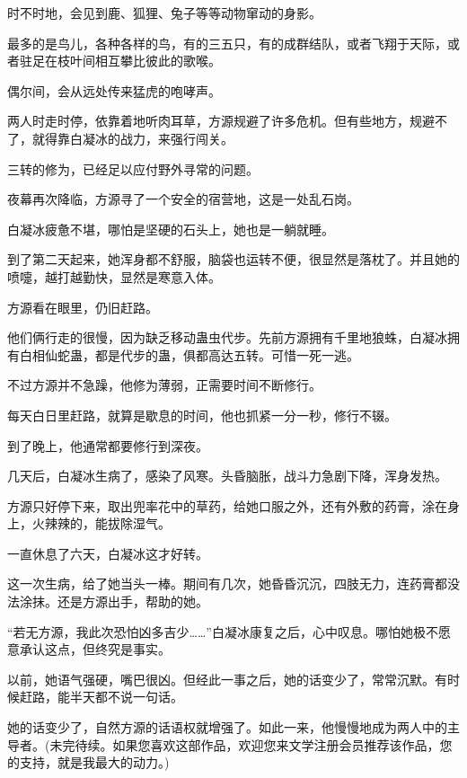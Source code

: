 \begin{this_body}
时不时地，会见到鹿、狐狸、兔子等等动物窜动的身影。

最多的是鸟儿，各种各样的鸟，有的三五只，有的成群结队，或者飞翔于天际，或者驻足在枝叶间相互攀比彼此的歌喉。

偶尔间，会从远处传来猛虎的咆哮声。

两人时走时停，依靠着地听肉耳草，方源规避了许多危机。但有些地方，规避不了，就得靠白凝冰的战力，来强行闯关。

三转的修为，已经足以应付野外寻常的问题。

夜幕再次降临，方源寻了一个安全的宿营地，这是一处乱石岗。

白凝冰疲惫不堪，哪怕是坚硬的石头上，她也是一躺就睡。

到了第二天起来，她浑身都不舒服，脑袋也运转不便，很显然是落枕了。并且她的喷嚏，越打越勤快，显然是寒意入体。

方源看在眼里，仍旧赶路。

他们俩行走的很慢，因为缺乏移动蛊虫代步。先前方源拥有千里地狼蛛，白凝冰拥有白相仙蛇蛊，都是代步的蛊，俱都高达五转。可惜一死一逃。

不过方源并不急躁，他修为薄弱，正需要时间不断修行。

每天白日里赶路，就算是歇息的时间，他也抓紧一分一秒，修行不辍。

到了晚上，他通常都要修行到深夜。

几天后，白凝冰生病了，感染了风寒。头昏脑胀，战斗力急剧下降，浑身发热。

方源只好停下来，取出兜率花中的草药，给她口服之外，还有外敷的药膏，涂在身上，火辣辣的，能拔除湿气。

一直休息了六天，白凝冰这才好转。

这一次生病，给了她当头一棒。期间有几次，她昏昏沉沉，四肢无力，连药膏都没法涂抹。还是方源出手，帮助的她。

“若无方源，我此次恐怕凶多吉少……”白凝冰康复之后，心中叹息。哪怕她极不愿意承认这点，但终究是事实。

以前，她语气强硬，嘴巴很凶。但经此一事之后，她的话变少了，常常沉默。有时候赶路，能半天都不说一句话。

她的话变少了，自然方源的话语权就增强了。如此一来，他慢慢地成为两人中的主导者。(未完待续。如果您喜欢这部作品，欢迎您来文学注册会员推荐该作品，您的支持，就是我最大的动力。)

\end{this_body}

